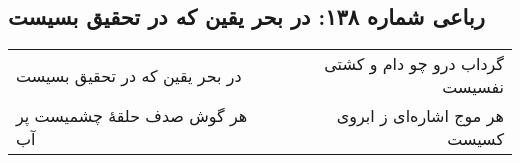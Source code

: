 \begin{center}
\section*{رباعی شماره ۱۳۸: در بحر یقین که در تحقیق بسیست}
\label{sec:sh138}
\begin{longtable}{l p{0.5cm} r}
در بحر یقین که در تحقیق بسیست
&&
گرداب درو چو دام و کشتی نفسیست
\\
هر گوش صدف حلقهٔ چشمیست پر آب
&&
هر موج اشاره‌ای ز ابروی کسیست
\\
\end{longtable}
\end{center}
